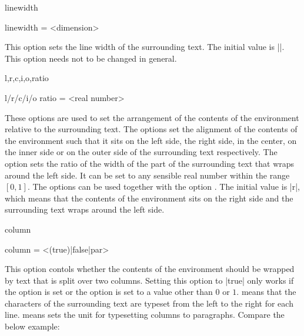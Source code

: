 \documentclass{ctxdoc}
\begin{document}
\begin{documentation}
 \begin{function}{linewidth}
   \begin{syntax}
     linewidth = <dimension>
   \end{syntax}
   This option sets the line width of the surrounding text. The initial value is |\linewidth|. This option needs not to be changed in general.
 \end{function}

 \begin{function}{l,r,c,i,o,ratio}
   \begin{syntax}
     l/r/c/i/o
     ratio = <real number>
   \end{syntax}
   These options are used to set the arrangement of the contents of the  environment relative to the surrounding text.
   The options  set the alignment of the contents of the  environment such that it sits on the left side, the right side, in the center, on the inner side or on the outer side of the surrounding text respectively.
   The option  sets the ratio of the width of the part of the surrounding text that wraps around the left side. It can be set to any sensible real number within the range $[0,1]$.
   The options  can be used together with the option .
   The initial value is |r|, which means that the contents of the  environment sits on the right side and the surrounding text wraps around the left side.
 \end{function}

 \begin{function}{column}
   \begin{syntax}
     column = <(true)|false|par>
   \end{syntax}
   This option contols whether the contents of the  environment should be wrapped by text that is split over two columns. Setting this option to |true| only works if the option  is set or the option  is set to a value other than $0$ or $1$.
    means that the characters of the surrounding text are typeset from the left to the right for each line.
    means sets the unit for typesetting columns to paragraphs. Compare the below example:
   \begin{SideBySideExample}[xrightmargin=\dimeval{20em+5mm}]
     \begin{wrapstuff}[c,1]
     \end{wrapstuff}
     \QIANZIWEN
     \begin{wrapstuff}[c,1,column=par]
     \end{wrapstuff}
     \QIANZIWEN
     \begin{wrapstuff}[c,0,column=false]
     \end{wrapstuff}
     \QIANZIWEN
   \end{SideBySideExample}
 \end{function}


\end{documentation}
\end{document}
